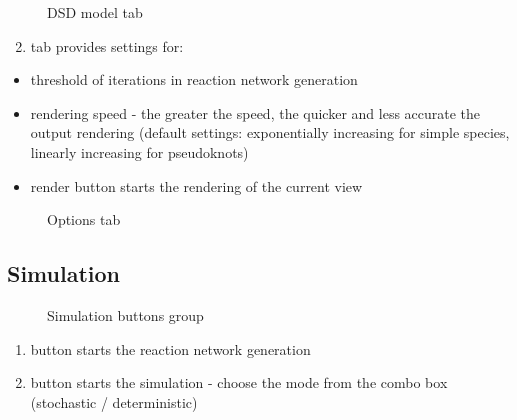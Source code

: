 \documentclass[a4paper,12pt,oneside,english]{sphinxmanual}
\begin{document}
\begin{figure}[htbp]
\centering
\capstart

\noindent{}
\caption{DSD model tab}\label{\detokenize{tutorial:id2}}\end{figure}
\begin{enumerate}
\setcounter{enumi}{1}
\item {} 
 tab provides settings for:

\end{enumerate}
\begin{itemize}
\item {} 
threshold of iterations in reaction network generation

\item {} 
rendering speed - the greater the speed, the quicker and less accurate the output rendering (default settings: exponentially increasing for simple species, linearly increasing for pseudoknots)

\item {} 
render button starts the rendering of the current view

\end{itemize}

\begin{figure}[htbp]
\centering
\capstart

\noindent{}
\caption{Options tab}\label{\detokenize{tutorial:id3}}\end{figure}


\subsection{Simulation}
\label{\detokenize{tutorial:simulation}}
\begin{figure}[htbp]
\centering
\capstart

\noindent{}
\caption{Simulation buttons group}\label{\detokenize{tutorial:id4}}\end{figure}
\begin{enumerate}
\item {} 
 button starts the reaction network generation

\item {} 
 button starts the simulation - choose the mode from the combo box (stochastic / deterministic)

\end{enumerate}
\end{document}
